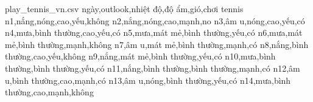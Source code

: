 \begin{filecontents*}{play_tennis_vn.csv}
ngày,outlook,nhiệt độ,độ ẩm,gió,chơi tennis
n1,nắng,nóng,cao,yếu,không
n2,nắng,nóng,cao,mạnh,no
n3,âm u,nóng,cao,yếu,có
n4,mưa,bình thường,cao,yếu,có
n5,mưa,mát mẻ,bình thường,yếu,có
n6,mưa,mát mẻ,bình thường,mạnh,không
n7,âm u,mát mẻ,bình thường,mạnh,có
n8,nắng,bình thường,cao,yếu,không
n9,nắng,mát mẻ,bình thường,yếu,có
n10,mưa,bình thường,bình thường,yếu,có
n11,nắng,bình thường,bình thường,mạnh,có
n12,âm u,bình thường,cao,mạnh,có
n13,âm u,nóng,bình thường,yếu,có
n14,mưa,bình thường,cao,mạnh,không
\end{filecontents*}